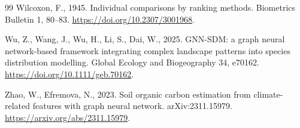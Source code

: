 \documentclass[a4paper,fleqn]{cas-sc}
\begin{document}
\begin{thebibliography}{99}
 Wilcoxon, F., 1945. Individual comparisons by ranking methods. Biometrics Bulletin 1, 80--83. \url{https://doi.org/10.2307/3001968}.

 Wu, Z., Wang, J., Wu, H., Li, S., Dai, W., 2025. GNN-SDM: a graph neural network-based framework integrating complex landscape patterns into species distribution modelling. Global Ecology and Biogeography 34, e70162. \url{https://doi.org/10.1111/geb.70162}.

 Zhao, W., Efremova, N., 2023. Soil organic carbon estimation from climate-related features with graph neural network. arXiv:2311.15979. \url{https://arxiv.org/abs/2311.15979}.

\end{thebibliography}
\end{document}
